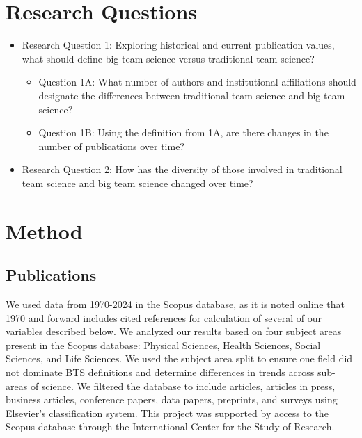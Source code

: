 \documentclass[
  man,floatsintext]{apa7}
\providecommand{\tightlist}{%
  \setlength{\itemsep}{0pt}\setlength{\parskip}{0pt}}
\begin{document}
\section{Research Questions}\label{research-questions}

\begin{itemize}
\tightlist
\item
  Research Question 1: Exploring historical and current publication
  values, what should define big team science versus traditional team science?

  \begin{itemize}
  \tightlist
  \item
    Question 1A: What number of authors and institutional
    affiliations should designate the differences between traditional team science and big team science?
  \item
    Question 1B: Using the definition from 1A, are there changes in
    the number of publications over time?
  \end{itemize}
\item
  Research Question 2: How has the diversity of those involved in traditional team
  science and big team science changed over time?
\end{itemize}

\section{Method}\label{method}

\subsection{Publications}\label{publications}

We used data from 1970-2024 in the Scopus database, as it is noted
online that 1970 and forward includes cited references for calculation
of several of our variables described below. We analyzed our results
based on four subject areas present in the Scopus database: Physical
Sciences, Health Sciences, Social Sciences, and Life Sciences. We used
the subject area split to ensure one field did not dominate BTS
definitions and determine differences in trends across sub-areas of
science. We filtered the database to include articles, articles in
press, business articles, conference papers, data papers, preprints, and
surveys using Elsevier's classification system. This project was
supported by access to the Scopus database through the International
Center for the Study of Research.
\end{document}
